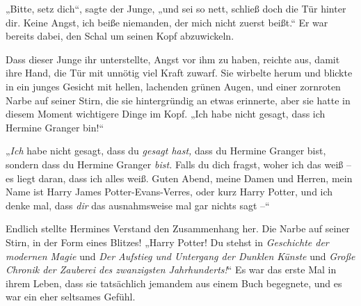 „Bitte, setz dich“, sagte der Junge, „und sei so nett, schließ doch die Tür hinter dir. Keine Angst, ich beiße niemanden, der mich nicht zuerst beißt.“ Er war bereits dabei, den Schal um seinen Kopf abzuwickeln.

Dass dieser Junge ihr unterstellte, Angst vor ihm zu haben, reichte aus, damit ihre Hand, die Tür mit unnötig viel Kraft zuwarf. Sie wirbelte herum und blickte in ein junges Gesicht mit hellen, lachenden grünen Augen, und einer zornroten Narbe auf seiner Stirn, die sie hintergründig an etwas erinnerte, aber sie hatte in diesem Moment wichtigere Dinge im Kopf. „Ich habe nicht gesagt, dass ich Hermine Granger bin!“

„\emph{Ich} habe nicht gesagt, dass du \emph{gesagt hast,} dass du Hermine Granger bist, sondern dass du Hermine Granger \emph{bist.} Falls du dich fragst, woher ich das weiß – es liegt daran, dass ich alles weiß. Guten Abend, meine Damen und Herren, mein Name ist Harry James Potter-Evans-Verres, oder kurz Harry Potter, und ich denke mal, dass \emph{dir} das ausnahmsweise mal gar nichts sagt –“

Endlich stellte Hermines Verstand den Zusammenhang her. Die Narbe auf seiner Stirn, in der Form eines Blitzes! „Harry Potter! Du stehst in \emph{Geschichte der modernen Magie} und \emph{Der Aufstieg und Untergang der Dunklen Künste} und \emph{Große Chronik der Zauberei des zwanzigsten Jahrhunderts!}“ Es war das erste Mal in ihrem Leben, dass sie tatsächlich jemandem aus einem Buch begegnete, und es war ein eher seltsames Gefühl.

